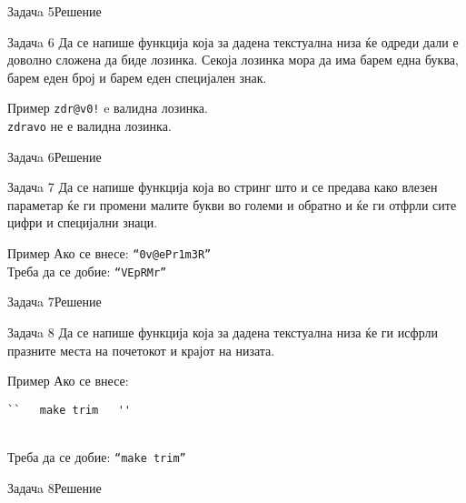 \begin{frame}[fragile]{Задачa 5}{Решение}

\end{frame}

\begin{frame}{Задачa 6}
Да се напише функција која за дадена текстуална низа ќе одреди дали е  доволно
сложена да биде лозинка. Секоја лозинка мора да има барем една буква, барем еден
број и барем еден специјален знак.
\begin{exampleblock}{Пример}
\texttt{zdr@v0!} e валидна лозинка.\\
\texttt{zdravo} не е валидна лозинка.
\end{exampleblock}
\end{frame}

\begin{frame}[fragile]{Задачa 6}{Решение}

\end{frame}

\begin{frame}{Задачa 7}
Да се напише функција која во стринг што и се предава како влезен параметар ќе
ги промени малите букви во големи и обратно и ќе ги отфрли сите цифри и
специјални знаци.
    
\begin{exampleblock}{Пример}
Ако се внесе: \texttt{``0v@ePr1m3R''} \\
Треба да се добие: \texttt{``VEpRMr''} 
\end{exampleblock}
\end{frame}

\begin{frame}[fragile]{Задачa 7}{Решение}

\end{frame}

\begin{frame}[fragile]{Задачa 8}
Да се напише функција која за дадена текстуална низа ќе ги исфрли празните места
на почетокот и крајот на низата.
\begin{exampleblock}{Пример}
Ако се внесе: \begin{verbatim}``   make trim   ''\end{verbatim} \\
Треба да се добие: \texttt{``make trim''} 
\end{exampleblock}
\end{frame}

\begin{frame}[fragile]{Задачa 8}{Решение}

\end{frame}
